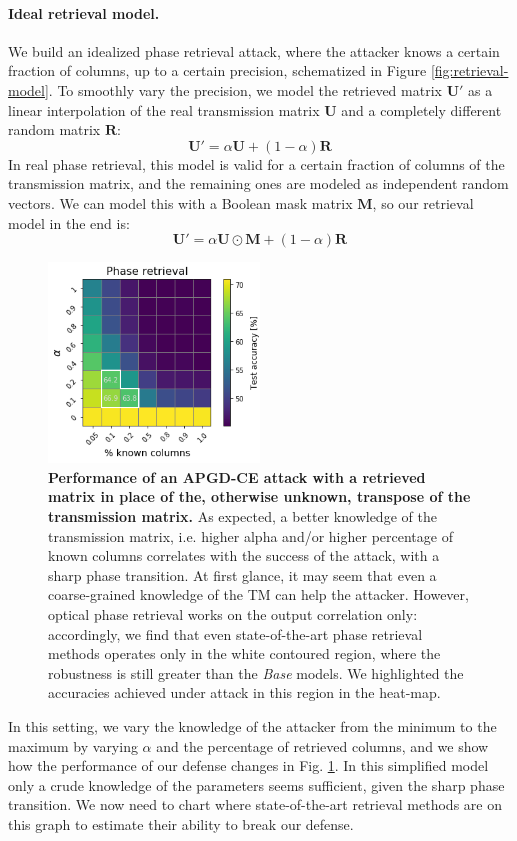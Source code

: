 \documentclass{article}
\begin{document}
\paragraph{Ideal retrieval model.} We build an idealized phase retrieval attack, where the attacker knows a certain fraction of columns, up to a certain precision, schematized in Figure \ref{fig:retrieval-model}. To smoothly vary the precision, we model the retrieved matrix $\mathbf{U'}$ as a linear interpolation of the real transmission matrix $\mathbf{U}$ and a completely different random matrix $\mathbf{R}$:
\begin{equation}
    \mathbf{U'} = \alpha\mathbf{U} + (1-\alpha)\mathbf{R}
\end{equation}
In real phase retrieval, this model is valid for a certain fraction of columns of the transmission matrix, and the remaining ones are modeled as independent random vectors. We can model this with a Boolean mask matrix $\mathbf{M}$, so our retrieval model in the end is:
\begin{equation}
    \mathbf{U'} = \alpha\mathbf{U}\odot\mathbf{M} + (1-\alpha)\mathbf{R}
\end{equation}
\begin{figure}
    \centering
    \includegraphics[width=0.5\textwidth]{phase_retrieval.png}
    \caption{\textbf{Performance of an APGD-CE attack with a retrieved matrix in place of the, otherwise unknown, transpose of the transmission matrix.} As expected, a better knowledge of the transmission matrix, i.e. higher alpha and/or higher percentage of known columns correlates with the success of the attack, with a sharp phase transition. At first glance, it may seem that even a coarse-grained knowledge of the TM can help the attacker. However, optical phase retrieval works on the output correlation only: accordingly, we find that even state-of-the-art phase retrieval methods operates only in the white contoured region, where the robustness is still greater than the \textit{Base} models. We highlighted the accuracies achieved under attack in this region in the heat-map.}
    \label{fig:phase_retrieval}
\end{figure}
In this setting, we vary the knowledge of the attacker from the minimum to the maximum by varying $\alpha$ and the percentage of retrieved columns, and we show how the performance of our defense changes in Fig. \ref{fig:phase_retrieval}. In this simplified model only a crude knowledge of the parameters seems sufficient, given the sharp phase transition. We now need to chart where state-of-the-art retrieval methods are on this graph to estimate their ability to break our defense.
\end{document}
